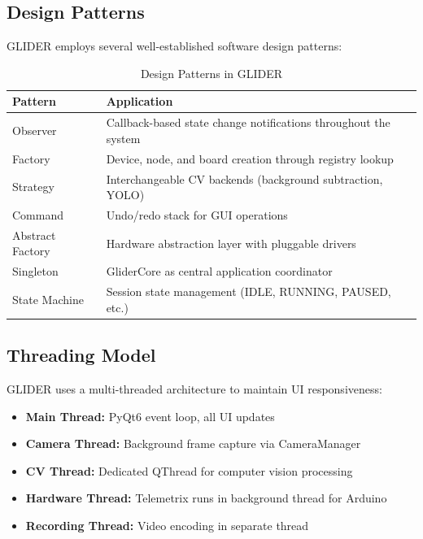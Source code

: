 \documentclass[11pt,a4paper]{article}
\begin{document}
\subsection{Design Patterns}

GLIDER employs several well-established software design patterns:

\begin{table}[H]
\centering
\begin{tabular}{@{}lp{10cm}@{}}
\toprule
\textbf{Pattern} & \textbf{Application} \\
\midrule
Observer & Callback-based state change notifications throughout the system \\
Factory & Device, node, and board creation through registry lookup \\
Strategy & Interchangeable CV backends (background subtraction, YOLO) \\
Command & Undo/redo stack for GUI operations \\
Abstract Factory & Hardware abstraction layer with pluggable drivers \\
Singleton & GliderCore as central application coordinator \\
State Machine & Session state management (IDLE, RUNNING, PAUSED, etc.) \\
\bottomrule
\end{tabular}
\caption{Design Patterns in GLIDER}
\end{table}

\subsection{Threading Model}

GLIDER uses a multi-threaded architecture to maintain UI responsiveness:

\begin{itemize}    \item \textbf{Main Thread:} PyQt6 event loop, all UI updates
    \item \textbf{Camera Thread:} Background frame capture via CameraManager
    \item \textbf{CV Thread:} Dedicated QThread for computer vision processing
    \item \textbf{Hardware Thread:} Telemetrix runs in background thread for Arduino
    \item \textbf{Recording Thread:} Video encoding in separate thread
\end{itemize}
\end{document}
